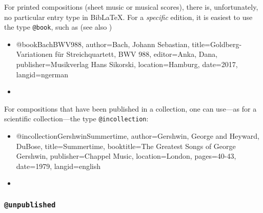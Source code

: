 For printed compositions (sheet music or musical scores), there is,
unfortunately, no particular entry type in BibLaTeX. For a \emph{specific}
edition, it is easiest to use the type \texttt{@book}, such as (see also
\cite{HaydnCelloConcerto2,ShostakovichOp110})
%
\begin{itemize}
\item[]
\begin{GenericCode}[numbers=none]
@book{BachBWV988,
  author={Bach, Johann Sebastian},
  title={Goldberg-Variationen für Streichquartett, BWV 988},
  editor={Anka, Dana},
  publisher={Musikverlag Hans Sikorski},
  location={Hamburg},
  date={2017},
  langid={ngerman}
}
\end{GenericCode}
\item[\cite{BachBWV988}] 
\end{itemize}
%
For compositions that have been published in a collection, one can use---as for
a scientific collection---the type \texttt{@incollection}:
%
\begin{itemize}
\item[]
\begin{GenericCode}[numbers=none]
@incollection{GershwinSummertime,
  author={Gershwin, George and Heyward, DuBose},
  title={Summertime},
  booktitle={The Greatest Songs of George Gershwin},
  publisher={Chappel Music},
  location={London},
  pages={40-43},
  date={1979},
  langid={english}
}
\end{GenericCode}
\item[\cite{GershwinSummertime}] 
\end{itemize}

\subsubsection{\texttt{\bfseries @unpublished}}
\label{sec:@unpublished}

